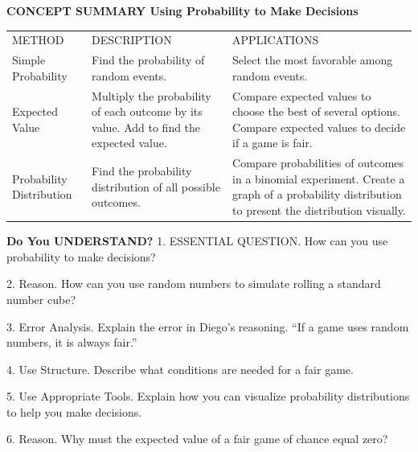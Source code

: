\documentclass{article}
\newenvironment{concept-summary}{}{}    %
\newcommand{\answer}[1]{}               %
\newcommand{\te}[1]{}                   %
\begin{document}
\begin{concept-summary}
\textbf{CONCEPT SUMMARY Using Probability to Make Decisions}
\begin{tabular}{lll}
METHOD & DESCRIPTION & APPLICATIONS \\
Simple Probability & Find the probability of random events. & Select the most favorable among random events. \\
Expected Value & Multiply the probability of each outcome by its value. Add to find the expected value. & Compare expected values to choose the best of several options. Compare expected values to decide if a game is fair. \\
Probability Distribution & Find the probability distribution of all possible outcomes. & Compare probabilities of outcomes in a binomial experiment. Create a graph of a probability distribution to present the distribution visually. \\
\end{tabular}
\textbf{Do You UNDERSTAND?}
1. ESSENTIAL QUESTION. How can you use probability to make decisions?
\answer{Evaluating probabilities can help you decide whether a game is fair, find the costs and benefits for a risky business venture, and make rational decisions based on expected values and returns rather than guesses.}
2. Reason. How can you use random numbers to simulate rolling a standard number cube?
\answer{Use a calculator to generate a random integer from 1 to 6, or draw at random from a set of 6 index cards labeled 1 to 6. Each number has the same probability of being drawn or generated as the same number turning up on the roll of a standard number cube.}
3. Error Analysis. Explain the error in Diego's reasoning.
``If a game uses random numbers, it is always fair.''
\te{Printed on a note with red X.}
\answer{Sample: How the numbers are assigned or what meaning is attributed to them is a separate factor that determines whether a game is fair.}
4. Use Structure. Describe what conditions are needed for a fair game.
\answer{A fair game requires that participants have an equal chance to win or an expected value of 0, meaning no participant has an advantage.}
5. Use Appropriate Tools. Explain how you can visualize probability distributions to help you make decisions.
\answer{Answers may vary. Sample: Inspecting the graph of a probability distribution or a tree diagram makes it easier to see how likely or unlikely certain outcomes are, and inform your decisions.}
6. Reason. Why must the expected value of a fair game of chance equal zero?
\answer{If the expected value for a game of chance is less than 0, then a player can expect to lose more often than they win. If the expected value is greater than 0, then a player can expect to win more often than they lose. In a fair game, a player will win as often as they lose in the long run.}

\end{concept-summary}
\end{document}
